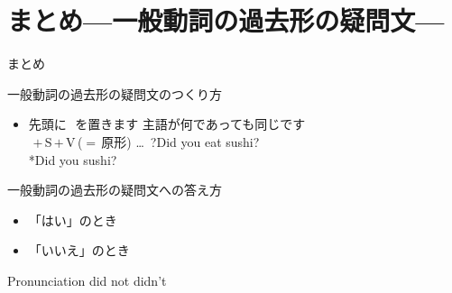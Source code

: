 \documentclass[aspectratio=169,xcolor={dvipsnames,table}]{beamer}
\begin{document}
\section{まとめ---一般動詞の過去形の疑問文---}
\begin{frame}[plain]{まとめ}

\begin{block}{一般動詞の過去形の疑問文のつくり方}\small
\begin{itemize}[square]
 \item   先頭に\,\,\,\,を置きます%
\hfill{\scriptsize 主語が何であっても同じです}\\[10pt]
	 \,\,$+$\,S\,$+$\,V\,{\scriptsize ($=$\,原形)} \ldots\,\,\,?\hfill{}Did you eat sushi?\\
\hfill{}*Did you  sushi?
\end{itemize}
     \end{block}

\pause

\begin{block}{一般動詞の過去形の疑問文への答え方}
\small
\begin{itemize}[square]
 \item 「はい」のとき\hfill{}\hspace{120pt}\mbox{}
 \item 「いいえ」のとき\hfill{}\hspace{120pt}\mbox{}
\end{itemize}
      \end{block}

\pause

\begin{block}{Pronunciation}
 \mbox{}\hfill{}did 
\hspace{25pt}not 
\hspace{25pt}didn't \hfill{}\mbox{}
\end{block}
\end{frame}


\end{document}
